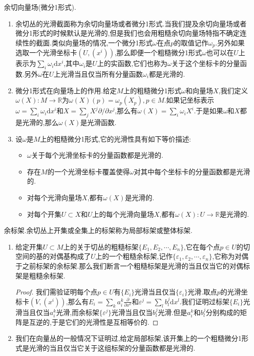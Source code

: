 余切向量场(微分1形式).
\begin{enumerate}
	\item 余切丛的光滑截面称为余切向量场或者微分1形式.当我们提及余切向量场或者微分1形式的时候默认是光滑的,但是我们也会用粗糙余切向量场特指不确定连续性的截面.类似向量场的情况,一个微分1形式$\omega$在点$p$的取值记作$\omega_p$.另外如果选取一个光滑坐标卡$(U,(x^i))$,那么即便一个粗糙微分1形式$\omega$也可以在$U$上表示为$\sum_i\omega_i\mathrm{d}x^i$,其中$\omega_i$是$U$上的实函数,它们也称为$\omega$关于这个坐标卡的分量函数.另外$\omega$在$U$上光滑当且仅当所有分量函数$\omega_i$都是光滑的.
	\item 微分1形式在向量场上的作用.给定$M$上的粗糙微分1形式$\omega$和向量场$X$,我们定义$\omega(X):M\to\mathbb{R}$为$\omega(X)(p)=\omega_p(X_p),p\in M$.如果记坐标表示$\omega=\sum_i\omega_i\mathrm{d}x^i$和$X=\sum_jX^j\partial/\partial x^j$,那么有$\omega(X)=\sum_i\omega_iX^i$.于是如果$\omega$和$X$都是光滑的,那么$\omega(X)$是光滑函数.
	\item 设$\omega$是$M$上的粗糙微分1形式,它的光滑性具有如下等价描述:
	\begin{itemize}
		\item $\omega$关于每个光滑坐标卡的分量函数都是光滑的.
		\item 存在$M$的一个光滑坐标卡覆盖使得$\omega$对其中每个坐标卡的分量函数都是光滑的.
		\item 对每个光滑向量场$X$,都有$\omega(X)$是光滑的.
		\item 对每个开集$U\subset X$和$U$上的每个光滑向量场$X$,都有$\omega(X):U\to\mathbb{R}$是光滑的.
	\end{itemize}
\end{enumerate}

余标架.余切丛上开集或全集上的标架称为局部标架或整体标架.
\begin{enumerate}
	\item 给定开集$U\subset M$上的关于切丛的粗糙标架$\{E_1,E_2,\cdots,E_n\}$,它在每个点$p\in U$的切空间的基的对偶基构成了$U$上的一个粗糙余标架,记作$\{\varepsilon_1,\varepsilon_2,\cdots,\varepsilon_n\}$,它称为对偶于之前标架的余标架.那么我们断言一个粗糙标架是光滑的当且仅当它的对偶标架是粗糙余标架.
	\begin{proof}
		
		我们需验证明每个点$p\in U$有$\{E_i\}$光滑当且仅当$\{\varepsilon_i\}$光滑.取点$p$的光滑坐标卡$(V,(x^i))$,那么有$E_i=\sum_ka_i^k\frac{\partial}{\partial x^k}$和$\varepsilon^j=\sum_lb_l^j\mathrm{d}x^l$.我们证明过标架$\{E_i\}$光滑当且仅当$a_i^k$光滑,而余标架$\{\varepsilon^j\}$光滑当且仅当$b_l^j$光滑.但是$a_i^k$和$b_l^j$分别构成的矩阵是互逆的,于是它们的光滑性是互相等价的.
	\end{proof}
    \item 我们在向量丛的一般情况下证明过,给定局部标架,该开集上的一个粗糙微分1形式是光滑的当且仅当它关于这组标架的分量函数都是光滑的.
\end{enumerate}

